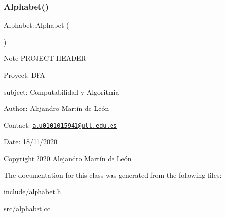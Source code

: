 \subsubsection{\texorpdfstring{Alphabet()}{Alphabet()}}
{\footnotesize\ttfamily Alphabet\+::\+Alphabet (\begin{DoxyParamCaption}{ }\end{DoxyParamCaption})}

\begin{DoxyNote}{Note}
P\+R\+O\+J\+E\+CT H\+E\+A\+D\+ER 

Proyect\+: D\+FA 

subject\+: Computabilidad y Algoritmia 

Author\+: Alejandro Martín de León 

Contact\+: \href{mailto:alu0101015941@ull.edu.es}{\tt alu0101015941@ull.\+edu.\+es} 

Date\+: 18/11/2020 

Copyright 2020 Alejandro Martín de León 
\end{DoxyNote}


The documentation for this class was generated from the following files\+:\begin{DoxyCompactItemize}
\item 
include/alphabet.\+h\item 
src/alphabet.\+cc\end{DoxyCompactItemize}
